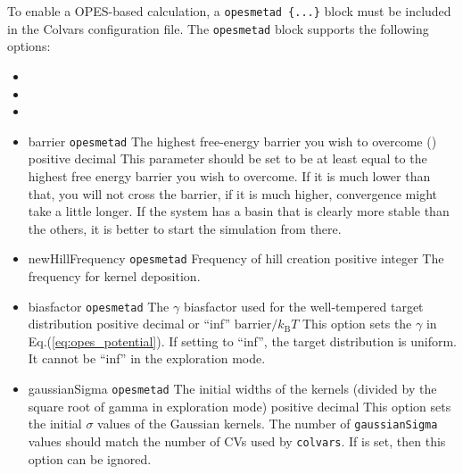 To enable a OPES-based calculation, a \texttt{opes{\textunderscore}metad \{...\}} block must be included in the Colvars configuration file. The \texttt{opes{\textunderscore}metad} block supports the following options:
\begin{itemize}
\item {}
\item {}
\item {}
\item %
  \key
    {barrier}{%
    \texttt{opes{\textunderscore}metad}}{%
    The highest free-energy barrier you wish to overcome (\energyunit)}{%
    positive decimal}{%
    This parameter should be set to be at least equal to the highest free energy barrier you wish to overcome. If it is much lower than that, you will not cross the barrier, if it is much higher, convergence might take a little longer. If the system has a basin that is clearly more stable than the others, it is better to start the simulation from there.}
\item %
  \key
    {newHillFrequency}{%
    \texttt{opes{\textunderscore}metad}}{%
    Frequency of hill creation}{%
    positive integer}{%
    The frequency for kernel deposition.}
\item %
  \keydef
    {biasfactor}{%
    \texttt{opes{\textunderscore}metad}}{%
    The $\gamma$ biasfactor used for the well-tempered target distribution}{%
    positive decimal or ``inf''}{%
    $\mathrm{barrier} / k_{\mathrm{B}} T$}{%
    This option sets the $\gamma$ in Eq.(\ref{eq:opes_potential}). If setting to ``inf'', the target distribution is uniform. It cannot be ``inf'' in the exploration mode.}
\item %
  \key
    {gaussianSigma}{%
    \texttt{opes{\textunderscore}metad}}{%
    The initial widths of the kernels (divided by the square root of gamma in exploration mode)}{%
    positive decimal}{%
    This option sets the initial $\sigma$ values of the Gaussian kernels. The number of \texttt{gaussianSigma} values should match the number of CVs used by \texttt{colvars}. If  is set, then this option can be ignored.}

\end{itemize}
